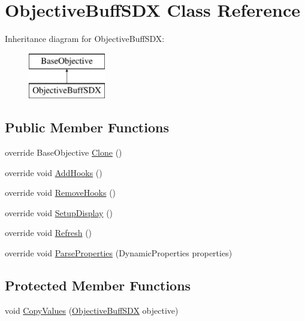 \hypertarget{class_objective_buff_s_d_x}{}\section{Objective\+Buff\+S\+DX Class Reference}
\label{class_objective_buff_s_d_x}
Inheritance diagram for Objective\+Buff\+S\+DX\+:\begin{figure}[H]
\begin{center}
\leavevmode
\includegraphics[height=2.000000cm]{class_objective_buff_s_d_x}
\end{center}
\end{figure}
\subsection*{Public Member Functions}
\begin{DoxyCompactItemize}
\item 
override Base\+Objective \mbox{\hyperlink{class_objective_buff_s_d_x_ad722c8d6d2f1ff2c93392db99b36898d}{Clone}} ()
\item 
override void \mbox{\hyperlink{class_objective_buff_s_d_x_a480d6da50219905d2c13185bfa612bc5}{Add\+Hooks}} ()
\item 
override void \mbox{\hyperlink{class_objective_buff_s_d_x_a279a2332ce0ee68a1039d5f07b9d68a7}{Remove\+Hooks}} ()
\item 
override void \mbox{\hyperlink{class_objective_buff_s_d_x_ad43a50ad5cd6ef6d839c824cb8005790}{Setup\+Display}} ()
\item 
override void \mbox{\hyperlink{class_objective_buff_s_d_x_adf0204ccd2aae5c18ab512c24b1681ec}{Refresh}} ()
\item 
override void \mbox{\hyperlink{class_objective_buff_s_d_x_ac7613fa46712ddfa0c7c4c4b848eca08}{Parse\+Properties}} (Dynamic\+Properties properties)
\end{DoxyCompactItemize}
\subsection*{Protected Member Functions}
\begin{DoxyCompactItemize}
\item 
void \mbox{\hyperlink{class_objective_buff_s_d_x_ae751ff717d73f70e38fd95b907bc9949}{Copy\+Values}} (\mbox{\hyperlink{class_objective_buff_s_d_x}{Objective\+Buff\+S\+DX}} objective)
\end{DoxyCompactItemize}
